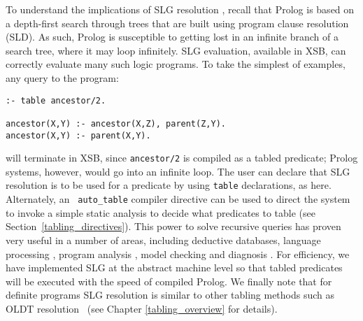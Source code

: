 To understand the implications of SLG resolution \cite{ChWa96}, recall
that Prolog is based on a depth-first search through trees that are
built using program clause resolution (SLD).  As such, Prolog is
susceptible to getting 
lost in an infinite branch of a search tree, where it may loop
infinitely.  SLG evaluation, available in XSB, can correctly evaluate
many such logic programs.  To take the simplest of examples, any query
to the program:
\begin{center}
\begin{minipage}{3.8in}
\begin{verbatim}
:- table ancestor/2.

ancestor(X,Y) :- ancestor(X,Z), parent(Z,Y).
ancestor(X,Y) :- parent(X,Y).
\end{verbatim}
\end{minipage}
\end{center}
will terminate in XSB, since {\tt ancestor/2} is compiled as a tabled
predicate; Prolog systems, however, would go into an infinite loop.
The user can declare that SLG resolution is to be used for a predicate
by using {\tt table} declarations, as here.  Alternately, an {\tt
auto\_table} compiler directive can be used to direct the system to
invoke a simple static analysis to decide what predicates to table
(see Section~\ref{tabling_directives}).  This power to solve recursive
queries has proven very useful in a number of areas, including
deductive databases, language processing \cite{syntactica, semantica},
program analysis \cite{DRW96, CoDS96, Boul97}, model checking
\cite{RRRSSW97} and diagnosis \cite{diagnostica}.  For efficiency, we
have implemented SLG at the abstract machine level so that tabled
predicates will be executed with the speed of compiled Prolog.  We
finally note that for definite programs SLG resolution is similar to
other tabling methods such as OLDT resolution~\cite{TaSa86} (see
Chapter
\ref{tabling_overview} for details).

